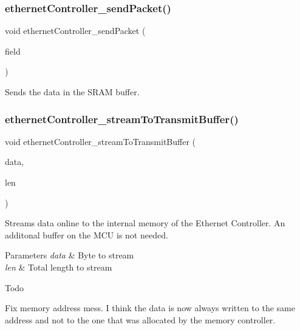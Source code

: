 \subsubsection{\texorpdfstring{ethernetController\_sendPacket()}{ethernetController\_sendPacket()}}
{\footnotesize\ttfamily void ethernet\+Controller\+\_\+send\+Packet (\begin{DoxyParamCaption}\item[{\mbox{\hyperlink{group__memory_ga1d04d80fae40964f55d2df46b5d64785}{memory\+Field\+\_\+t}}}]{field }\end{DoxyParamCaption})}



Sends the data in the S\+R\+AM buffer. 

\mbox{\label{group__data__transmission_ga9c0d9b39642cf6b7e220b9f0b44e3e02}} 
\subsubsection{\texorpdfstring{ethernetController\_streamToTransmitBuffer()}{ethernetController\_streamToTransmitBuffer()}}
{\footnotesize\ttfamily void ethernet\+Controller\+\_\+stream\+To\+Transmit\+Buffer (\begin{DoxyParamCaption}\item[{uint8\+\_\+t}]{data,  }\item[{uint16\+\_\+t}]{len }\end{DoxyParamCaption})}

Streams data online to the internal memory of the Ethernet Controller. An additonal buffer on the M\+CU is not needed. 
\begin{DoxyParams}{Parameters}
{\em data} & Byte to stream \\
\hline
{\em len} & Total length to stream \\
\hline
\end{DoxyParams}
\begin{DoxyRefDesc}{Todo}
\item[\mbox{\hyperlink{todo__todo000001}{Todo}}]Fix memory address mess. I think the data is now always written to the same address and not to the one that was allocated by the memory controller. \end{DoxyRefDesc}
\mbox{\label{group__data__transmission_ga858fd557b9ef00b3fd8166381e415bec}} 
